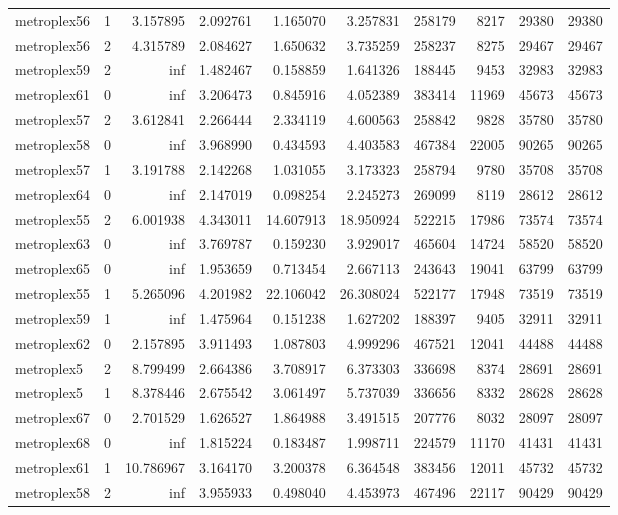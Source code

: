 \documentclass[../../../thesis.tex]{subfiles}
\begin{document}
\begin{longtable}{|l|r|r|r|r|r|r|r|r|r|}
metroplex56 & 1 & 3.157895 & 2.092761 & 1.165070 & 3.257831 & 258179 & 8217 & 29380 & 29380 \\
metroplex56 & 2 & 4.315789 & 2.084627 & 1.650632 & 3.735259 & 258237 & 8275 & 29467 & 29467 \\
metroplex59 & 2 & inf & 1.482467 & 0.158859 & 1.641326 & 188445 & 9453 & 32983 & 32983 \\
metroplex61 & 0 & inf & 3.206473 & 0.845916 & 4.052389 & 383414 & 11969 & 45673 & 45673 \\
metroplex57 & 2 & 3.612841 & 2.266444 & 2.334119 & 4.600563 & 258842 & 9828 & 35780 & 35780 \\
metroplex58 & 0 & inf & 3.968990 & 0.434593 & 4.403583 & 467384 & 22005 & 90265 & 90265 \\
metroplex57 & 1 & 3.191788 & 2.142268 & 1.031055 & 3.173323 & 258794 & 9780 & 35708 & 35708 \\
metroplex64 & 0 & inf & 2.147019 & 0.098254 & 2.245273 & 269099 & 8119 & 28612 & 28612 \\
metroplex55 & 2 & 6.001938 & 4.343011 & 14.607913 & 18.950924 & 522215 & 17986 & 73574 & 73574 \\
metroplex63 & 0 & inf & 3.769787 & 0.159230 & 3.929017 & 465604 & 14724 & 58520 & 58520 \\
metroplex65 & 0 & inf & 1.953659 & 0.713454 & 2.667113 & 243643 & 19041 & 63799 & 63799 \\
metroplex55 & 1 & 5.265096 & 4.201982 & 22.106042 & 26.308024 & 522177 & 17948 & 73519 & 73519 \\
metroplex59 & 1 & inf & 1.475964 & 0.151238 & 1.627202 & 188397 & 9405 & 32911 & 32911 \\
metroplex62 & 0 & 2.157895 & 3.911493 & 1.087803 & 4.999296 & 467521 & 12041 & 44488 & 44488 \\
metroplex5 & 2 & 8.799499 & 2.664386 & 3.708917 & 6.373303 & 336698 & 8374 & 28691 & 28691 \\
metroplex5 & 1 & 8.378446 & 2.675542 & 3.061497 & 5.737039 & 336656 & 8332 & 28628 & 28628 \\
metroplex67 & 0 & 2.701529 & 1.626527 & 1.864988 & 3.491515 & 207776 & 8032 & 28097 & 28097 \\
metroplex68 & 0 & inf & 1.815224 & 0.183487 & 1.998711 & 224579 & 11170 & 41431 & 41431 \\
metroplex61 & 1 & 10.786967 & 3.164170 & 3.200378 & 6.364548 & 383456 & 12011 & 45732 & 45732 \\
metroplex58 & 2 & inf & 3.955933 & 0.498040 & 4.453973 & 467496 & 22117 & 90429 & 90429 \\

\end{longtable}
\end{document}

